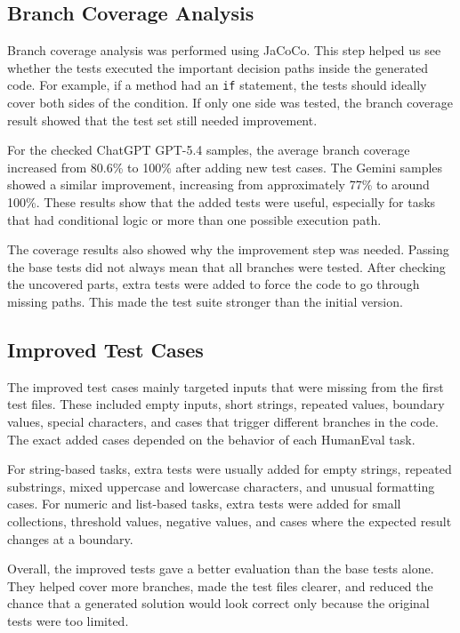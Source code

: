 \documentclass[journal]{IEEEtran}
\begin{document}
\subsection{Branch Coverage Analysis}

Branch coverage analysis was performed using JaCoCo. This step helped us see whether the tests executed the important decision paths inside the generated code. For example, if a method had an \texttt{if} statement, the tests should ideally cover both sides of the condition. If only one side was tested, the branch coverage result showed that the test set still needed improvement.

For the checked ChatGPT GPT-5.4 samples, the average branch coverage increased from 80.6\% to 100\% after adding new test cases. The Gemini samples showed a similar improvement, increasing from approximately 77\% to around 100\%. These results show that the added tests were useful, especially for tasks that had conditional logic or more than one possible execution path.

The coverage results also showed why the improvement step was needed. Passing the base tests did not always mean that all branches were tested. After checking the uncovered parts, extra tests were added to force the code to go through missing paths. This made the test suite stronger than the initial version.

\subsection{Improved Test Cases}

The improved test cases mainly targeted inputs that were missing from the first test files. These included empty inputs, short strings, repeated values, boundary values, special characters, and cases that trigger different branches in the code. The exact added cases depended on the behavior of each HumanEval task.

For string-based tasks, extra tests were usually added for empty strings, repeated substrings, mixed uppercase and lowercase characters, and unusual formatting cases. For numeric and list-based tasks, extra tests were added for small collections, threshold values, negative values, and cases where the expected result changes at a boundary.

Overall, the improved tests gave a better evaluation than the base tests alone. They helped cover more branches, made the test files clearer, and reduced the chance that a generated solution would look correct only because the original tests were too limited.
\end{document}
